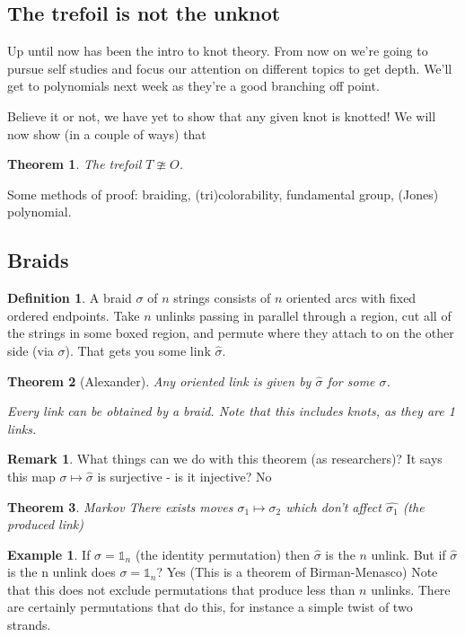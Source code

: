 \documentclass[11pt]{article}
\newcommand{\identity}{\mathds{1}}
\theoremstyle{plain}
\newtheorem{thm}{Theorem}
\theoremstyle{definition}
\newtheorem{remark}{Remark}
\newtheorem{definition}{Definition}
\newtheorem{ex}{Example}
\begin{document}
\subsection{The trefoil is not the unknot}


Up until now has been the intro to knot theory. From now on we're going to pursue self studies and focus our attention on different topics to get depth. We'll get to polynomials next week as they're a good branching off point.

Believe it or not, we have yet to show that any given knot is knotted! We will now show (in a couple of ways) that

\begin{thm}
The trefoil $T\ncong O$.
\end{thm}

Some methods of proof: braiding, (tri)colorability, fundamental group, (Jones) polynomial.

\subsection{Braids}

\begin{definition}
  A braid $\sigma$ of $n$ strings consists of $n$ oriented arcs with fixed ordered endpoints.
  Take $n$ unlinks passing in parallel through a region, cut all of the strings in some boxed region, and permute where they attach to on the other side (via $\sigma$). That gets you some link $\hat\sigma$.
\end{definition}


\begin{thm}[Alexander]
  Any oriented link is given by $\hat{\sigma}$ for some $\sigma$.

  Every link can be obtained by a braid. Note that this includes knots, as they are 1 links.
\end{thm}


\begin{remark}
  What things can we do with this theorem (as researchers)? It says this map $\sigma\mapsto\hat\sigma$ is surjective - is it injective? No
\end{remark}



\begin{thm}{Markov}
  There exists moves $\sigma_1  \mapsto \sigma_2$ which don't affect $\hat{\sigma_1}$ (the produced link)
\end{thm}


\begin{ex}
  If $\sigma = \identity_n$ (the identity permutation) then $\hat{\sigma}$ is the $n$ unlink.
  But if $\hat{\sigma}$ is the n unlink does $\sigma = \identity_n$? Yes (This is a theorem of Birman-Menasco)
  Note that this does not exclude permutations that produce less than $n$ unlinks. There are certainly permutations that do this, for instance a simple twist of two strands.
\end{ex}
\end{document}
